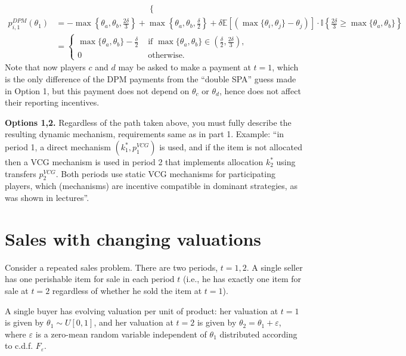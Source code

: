 \documentclass[a4paper]{article}
\begin{document}
\begin{enumerate}
\begin{align*}
\begin{cases}
			\end{cases}
		\end{align*}
		\begin{align*}
			p^{DPM}_{i,1} (\theta_1) &= -\max \left\{ \theta_a, \theta_b, \frac{2\delta}{3} \right\} + \max \left\{ \theta_a, \theta_b, \frac{\delta}{2} \right\} + \delta \mathbb{E} \left[ (\max\{\theta_i,\theta_j\} - \theta_j) \right] \cdot \mathbb{I}\left\{ \frac{2\delta}{3} \geq \max\{ \theta_a,\theta_b\} \right\}
			\\
			&= \begin{cases}
				\max \{\theta_a, \theta_b\} - \frac{\delta}{2} & \text{ if } \max \{\theta_a, \theta_b\} \in \left(\frac{\delta}{2}, \frac{2\delta}{3} \right),
				\\
				0 & \text{ otherwise.}
			\end{cases}
		\end{align*}
		Note that now players $c$ and $d$ may be asked to make a payment at $t=1$, which is the only difference of the DPM payments from the ``double SPA'' guess made in Option 1, but this payment does not depend on $\theta_c$ or $\theta_d$, hence does not affect their reporting incentives.
		
		\textbf{Options 1,2.} Regardless of the path taken above, you must fully describe the resulting dynamic mechanism, requirements same as in part 1. Example: ``in period 1, a direct mechanism $(k^*_1,p^{VCG}_1)$ is used, and if the item is not allocated then a VCG mechanism is used in period 2 that implements allocation $k^*_2$ using transfers $p^{VCG}_{2}$. Both periods use static VCG mechanisms for participating players, which (mechanisms) are incentive compatible in dominant strategies, as was shown in lectures''.
	\end{enumerate}
\fi



\section{Sales with changing valuations}
	Consider a repeated sales problem. There are two periods, $t=1,2$. A single seller has one perishable item for sale in each period $t$ (i.e., he has exactly one item for sale at $t=2$ regardless of whether he sold the item at $t=1$). 
	
	A single buyer has evolving valuation per unit of product: her valuation at $t=1$ is given by $\theta_1 \sim U[0,1]$, and her valuation at $t=2$ is given by $\theta_2 = \theta_1 + \varepsilon$, where $\varepsilon$ is a zero-mean random variable independent of $\theta_1$ distributed according to c.d.f. $F_\varepsilon$.
	
\end{document}
